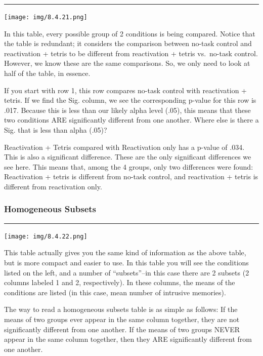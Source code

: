 \documentclass[]{book}
\begin{document}
\begin{center}\rule{0.5\linewidth}{0.5pt}\end{center}

\texttt{[image: img/8.4.21.png]}

In this table, every possible group of 2 conditions is being compared.
Notice that the table is redundant; it considers the comparison between
no-task control and reactivation + tetris to be different from
reactivation + tetris vs.~no-task control. However, we know these are
the same comparisons. So, we only need to look at half of the table, in
essence.

If you start with row 1, this row compares no-task control with
reactivation + tetris. If we find the Sig. column, we see the
corresponding p-value for this row is .017. Because this is less than
our likely alpha level (.05), this means that these two conditions ARE
significantly different from one another. Where else is there a Sig.
that is less than alpha (.05)?

Reactivation + Tetris compared with Reactivation only has a p-value of
.034. This is also a significant difference. These are the only
significant differences we see here. This means that, among the 4
groups, only two differences were found: Reactivation + tetris is
different from no-task control, and reactivation + tetris is different
from reactivation only.

\subsubsection{Homogeneous Subsets}\label{homogeneous-subsets}

\begin{center}\rule{0.5\linewidth}{0.5pt}\end{center}

\texttt{[image: img/8.4.22.png]}

This table actually gives you the same kind of information as the above
table, but is more compact and easier to use. In this table you will see
the conditions listed on the left, and a number of ``subsets''--in this
case there are 2 subsets (2 columns labeled 1 and 2, respectively). In
these columns, the means of the conditions are listed (in this case,
mean number of intrusive memories).

The way to read a homogeneous subsets table is as simple as follows: If
the means of two groups ever appear in the same column together, they
are not significantly different from one another. If the means of two
groups NEVER appear in the same column together, then they ARE
significantly different from one another.
\end{document}
